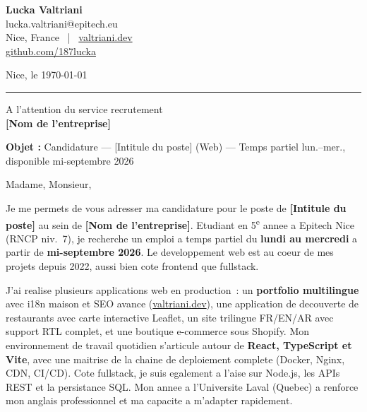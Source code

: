 \documentclass[11pt,a4paper]{article}
\newcommand{\myphone}{}
\newcommand{\entreprise}{[Nom de l'entreprise]}
\newcommand{\poste}{[Intitule du poste]}
\begin{document}
\begin{minipage}[t]{0.55\linewidth}
  {\large\bfseries\color{accent} Lucka Valtriani}\\[2pt]
  {\small\color{gray}
    \myphone{}lucka.valtriani@epitech.eu\\
    Nice, France ~|~ \href{https://valtriani.dev}{valtriani.dev}\\
    \href{https://github.com/187lucka}{github.com/187lucka}
  }
\end{minipage}
\hfill
\begin{minipage}[t]{0.38\linewidth}
  \raggedleft
  {\small\color{gray} Nice, le \today}
\end{minipage}

\vspace{0.5pt}
{\color{accent}\rule{\linewidth}{0.6pt}}
\vspace{14pt}

{\small\color{gray}
  A l'attention du service recrutement\\
  \textbf{\entreprise}
}

\vspace{14pt}

\noindent\textbf{Objet :} Candidature --- \poste{} (Web) --- Temps partiel lun.--mer., disponible mi-septembre 2026

\vspace{18pt}

Madame, Monsieur,

\vspace{4pt}

Je me permets de vous adresser ma candidature pour le poste de \textbf{\poste} au sein de \textbf{\entreprise}. Etudiant en 5\textsuperscript{e} annee a Epitech Nice (RNCP niv.~7), je recherche un emploi a temps partiel du \textbf{lundi au mercredi} a partir de \textbf{mi-septembre 2026}. Le developpement web est au coeur de mes projets depuis 2022, aussi bien cote frontend que fullstack.

J'ai realise plusieurs applications web en production~: un \textbf{portfolio multilingue} avec i18n maison et SEO avance (\href{https://valtriani.dev}{valtriani.dev}), une application de decouverte de restaurants avec carte interactive Leaflet, un site trilingue FR/EN/AR avec support RTL complet, et une boutique e-commerce sous Shopify. Mon environnement de travail quotidien s'articule autour de \textbf{React, TypeScript et Vite}, avec une maitrise de la chaine de deploiement complete (Docker, Nginx, CDN, CI/CD). Cote fullstack, je suis egalement a l'aise sur Node.js, les APIs REST et la persistance SQL. Mon annee a l'Universite Laval (Quebec) a renforce mon anglais professionnel et ma capacite a m'adapter rapidement.
\end{document}

